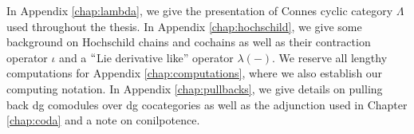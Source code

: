 In Appendix \ref{chap:lambda}, we give the presentation of Connes cyclic category $\Lambda$ used throughout the thesis. In Appendix \ref{chap:hochschild}, we give some background on Hochschild chains and cochains as well as their contraction operator $\iota$ and a $``$Lie derivative like'' operator $\lambda(-)$. We reserve all lengthy computations for Appendix \ref{chap:computations}, where we also establish our computing notation. In Appendix \ref{chap:pullbacks}, we give details on pulling back dg comodules over dg cocategories as well as the adjunction used in Chapter \ref{chap:coda} and a note on conilpotence.



